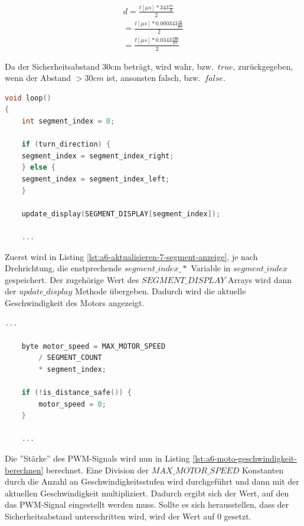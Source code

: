 \begin{align}
    d = \frac{t[\mu s] * 343 \frac{m}{\mathbf{s}}}{2} \\
    = \frac{t[\mu s] * 0.000343 \frac{m}{\mathbf{\mu s}}}{2} \\
    = \frac{t[\mu s] * 0.0343 \frac{\mathbf{cm}}{\mu s}}{2}
\end{align}

Da der Sicherheitsabstand 30cm beträgt, wird wahr, bzw.\ $true$, zurückgegeben, wenn der Abstand $> 30cm$ ist, ansonsten falsch, bzw.\ $false$.

\newpage

\begin{lstlisting}[language=C,label={lst:a6-aktualisieren-7-segment-anzeige}, caption={Einstellen der 7-Segment Anzeige}]
void loop()
{
    int segment_index = 0;

    if (turn_direction) {
    segment_index = segment_index_right;
    } else {
    segment_index = segment_index_left;
    }

    update_display(SEGMENT_DISPLAY[segment_index]);

    ...
\end{lstlisting}

Zuerst wird in Listing \ref{lst:a6-aktualisieren-7-segment-anzeige}, je nach Drehrichtung, die enstprechende $segment\_index\_*$ Variable in $segment\_index$ gespeichert.
Der zugehörige Wert des $SEGMENT\_DISPLAY$ Arrays wird dann der $update\_display$ Methode übergeben.
Dadurch wird die aktuelle Geschwindigkeit des Motors angezeigt.

\begin{lstlisting}[language=C,label={lst:a6-moto-geschwindigkeit-berechnen}, caption={Berechnung des PWM-Signals}]
    ...

    byte motor_speed = MAX_MOTOR_SPEED
        / SEGMENT_COUNT
        * segment_index;

    if (!is_distance_safe()) {
        motor_speed = 0;
    }

    ...
\end{lstlisting}

Die ''Stärke'' des PWM-Signals wird nun in Listing \ref{lst:a6-moto-geschwindigkeit-berechnen} berechnet.
Eine Division der $MAX\_MOTOR\_SPEED$ Konstanten durch die Anzahl an Geschwindigkeitsstufen wird durchgeführt und dann mit der aktuellen Geschwindigkeit multipliziert.
Dadurch ergibt sich der Wert, auf den das PWM-Signal eingestellt werden muss.
Sollte es sich herausstellen, dass der Sicherheitsabstand unterschritten wird, wird der Wert auf 0 gesetzt.


